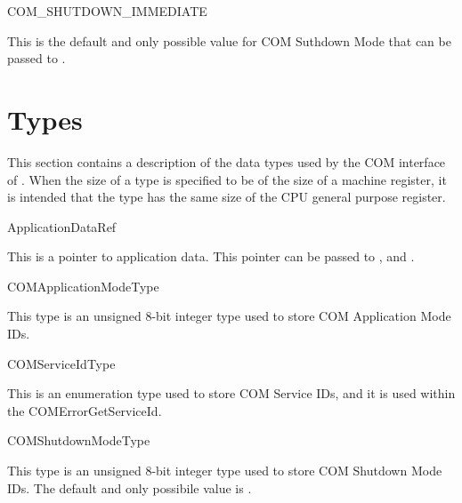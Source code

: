 \begin{constant}{COM\_SHUTDOWN\_IMMEDIATE}
  \begin{constantdescription}
    This is the default and only possible value for COM Suthdown Mode that can 
    be passed to .
  \end{constantdescription}
\end{constant}

\pagebreak




\section{Types}
\label{sec:types}

This section contains a description of the data types used by the COM
interface of \ee. When the size of a type is specified to be of the
size of a machine register, it is intended that the type has the same
size of the CPU general purpose register.

\begin{type}{ApplicationDataRef}
  \begin{typedescription}
    This is a pointer to application data. This pointer can be passed to 
    ,  and .  
  \end{typedescription}
\end{type}

\begin{type}{COMApplicationModeType}
  \begin{typedescription}
   This type is an unsigned 8-bit integer type used to store COM Application Mode 
   IDs.
  \end{typedescription}
\end{type}

\begin{type}{COMServiceIdType}
  \begin{typedescription}
    This is an enumeration type used to store COM Service IDs, and it is used 
    within the COMErrorGetServiceId.
  \end{typedescription}
\end{type}

\begin{type}{COMShutdownModeType}
  \begin{typedescription}
    This type is an unsigned 8-bit integer type used to store COM Shutdown Mode 
    IDs. The default and only possibile value is . 
  \end{typedescription}
\end{type}

